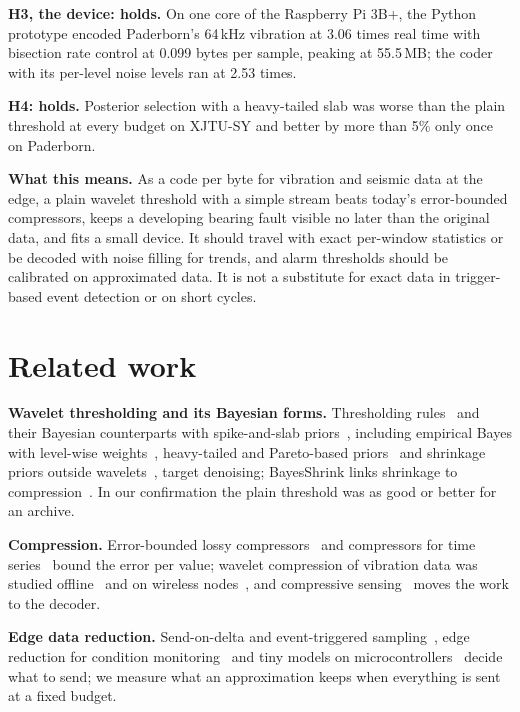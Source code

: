 \documentclass[sigconf,nonacm]{acmart}
\begin{document}
\textbf{H3, the device: holds.} On one core of the Raspberry Pi 3B+, the Python prototype encoded Paderborn's 64\,kHz vibration at 3.06 times real time with bisection rate control at 0.099 bytes per sample, peaking at 55.5\,MB; the coder with its per-level noise levels ran at 2.53 times.

\textbf{H4: holds.} Posterior selection with a heavy-tailed slab was worse than the plain threshold at every budget on XJTU-SY and better by more than 5\% only once on Paderborn.

\textbf{What this means.} As a code per byte for vibration and seismic data at the edge, a plain wavelet threshold with a simple stream beats today's error-bounded compressors, keeps a developing bearing fault visible no later than the original data, and fits a small device. It should travel with exact per-window statistics or be decoded with noise filling for trends, and alarm thresholds should be calibrated on approximated data. It is not a substitute for exact data in trigger-based event detection or on short cycles.

\section{Related work}\label{sec:related}
\textbf{Wavelet thresholding and its Bayesian forms.} Thresholding rules~\cite{donoho1994,donoho1995,johnstone1997} and their Bayesian counterparts with spike-and-slab priors~\cite{chipman1997,abramovich1998,clyde2000,vidakovic1998,vidakovic1999}, including empirical Bayes with level-wise weights~\cite{johnstone2004,johnstone2005,johnstone2005ebayes}, heavy-tailed and Pareto-based priors~\cite{achim2003,boubchir2006,figueiredo2001,rivoirard2004,rivoirard2005} and shrinkage priors outside wavelets~\cite{armagan2013,carvalho2010,rockova2018,cevher2009}, target denoising; BayesShrink links shrinkage to compression~\cite{chang2000}. In our confirmation the plain threshold was as good or better for an archive.

\textbf{Compression.} Error-bounded lossy compressors~\cite{di2016,liang2023,lindstrom2014} and compressors for time series~\cite{chandak2020,munizcuza2024} bound the error per value; wavelet compression of vibration data was studied offline~\cite{staszewski1998} and on wireless nodes~\cite{xu2004}, and compressive sensing~\cite{ji2008,bao2011} moves the work to the decoder.

\textbf{Edge data reduction.} Send-on-delta and event-triggered sampling~\cite{miskowicz2006}, edge reduction for condition monitoring~\cite{michala2022,pandey2025} and tiny models on microcontrollers~\cite{banbury2021,koizumi2020} decide what to send; we measure what an approximation keeps when everything is sent at a fixed budget.
\end{document}
